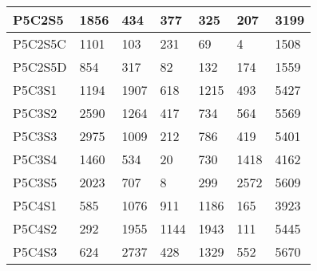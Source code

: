 \begin{longtable}{lllllll}
\multicolumn{1}{|l|}{P5C2S5} & \multicolumn{1}{l|}{1856} & \multicolumn{1}{l|}{434} & \multicolumn{1}{l|}{377} & \multicolumn{1}{l|}{325} & \multicolumn{1}{l|}{207} & \multicolumn{1}{l|}{3199} \\ \hline
\multicolumn{1}{|l|}{P5C2S5C} & \multicolumn{1}{l|}{1101} & \multicolumn{1}{l|}{103} & \multicolumn{1}{l|}{231} & \multicolumn{1}{l|}{69} & \multicolumn{1}{l|}{4} & \multicolumn{1}{l|}{1508} \\ \hline
\multicolumn{1}{|l|}{P5C2S5D} & \multicolumn{1}{l|}{854} & \multicolumn{1}{l|}{317} & \multicolumn{1}{l|}{82} & \multicolumn{1}{l|}{132} & \multicolumn{1}{l|}{174} & \multicolumn{1}{l|}{1559} \\ \hline
\multicolumn{1}{|l|}{P5C3S1} & \multicolumn{1}{l|}{1194} & \multicolumn{1}{l|}{1907} & \multicolumn{1}{l|}{618} & \multicolumn{1}{l|}{1215} & \multicolumn{1}{l|}{493} & \multicolumn{1}{l|}{5427} \\ \hline
\multicolumn{1}{|l|}{P5C3S2} & \multicolumn{1}{l|}{2590} & \multicolumn{1}{l|}{1264} & \multicolumn{1}{l|}{417} & \multicolumn{1}{l|}{734} & \multicolumn{1}{l|}{564} & \multicolumn{1}{l|}{5569} \\ \hline
\multicolumn{1}{|l|}{P5C3S3} & \multicolumn{1}{l|}{2975} & \multicolumn{1}{l|}{1009} & \multicolumn{1}{l|}{212} & \multicolumn{1}{l|}{786} & \multicolumn{1}{l|}{419} & \multicolumn{1}{l|}{5401} \\ \hline
\multicolumn{1}{|l|}{P5C3S4} & \multicolumn{1}{l|}{1460} & \multicolumn{1}{l|}{534} & \multicolumn{1}{l|}{20} & \multicolumn{1}{l|}{730} & \multicolumn{1}{l|}{1418} & \multicolumn{1}{l|}{4162} \\ \hline
\multicolumn{1}{|l|}{P5C3S5} & \multicolumn{1}{l|}{2023} & \multicolumn{1}{l|}{707} & \multicolumn{1}{l|}{8} & \multicolumn{1}{l|}{299} & \multicolumn{1}{l|}{2572} & \multicolumn{1}{l|}{5609} \\ \hline
\multicolumn{1}{|l|}{P5C4S1} & \multicolumn{1}{l|}{585} & \multicolumn{1}{l|}{1076} & \multicolumn{1}{l|}{911} & \multicolumn{1}{l|}{1186} & \multicolumn{1}{l|}{165} & \multicolumn{1}{l|}{3923} \\ \hline
\multicolumn{1}{|l|}{P5C4S2} & \multicolumn{1}{l|}{292} & \multicolumn{1}{l|}{1955} & \multicolumn{1}{l|}{1144} & \multicolumn{1}{l|}{1943} & \multicolumn{1}{l|}{111} & \multicolumn{1}{l|}{5445} \\ \hline
\multicolumn{1}{|l|}{P5C4S3} & \multicolumn{1}{l|}{624} & \multicolumn{1}{l|}{2737} & \multicolumn{1}{l|}{428} & \multicolumn{1}{l|}{1329} & \multicolumn{1}{l|}{552} & \multicolumn{1}{l|}{5670} \\ \hline

\end{longtable}

